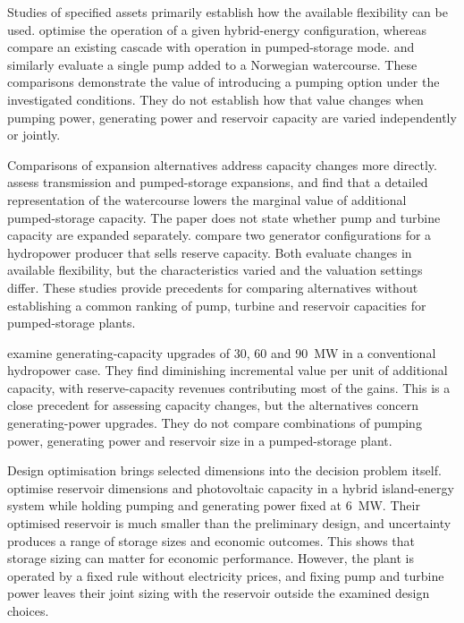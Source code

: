 Studies of specified assets primarily establish how the available
flexibility can be used. \citet{naval2025optimization} optimise the
operation of a given hybrid-energy configuration, whereas
\citet{ak2019quantifying} compare an existing cascade with operation in
pumped-storage mode. \citet{alic2023optimal} and
\citet{schuller2024practical} similarly evaluate a single pump added to
a Norwegian watercourse. These comparisons demonstrate the value of
introducing a pumping option under the investigated conditions. They do
not establish how that value changes when pumping power, generating
power and reservoir capacity are varied independently or jointly.

Comparisons of expansion alternatives address capacity changes more
directly. \citet{helseth2017} assess transmission and pumped-storage
expansions, and find that a detailed representation of the watercourse
lowers the marginal value of additional pumped-storage capacity. The
paper does not state whether pump and turbine capacity are expanded
separately. \citet{helseth2017iet} compare two generator configurations
for a hydropower producer that sells reserve capacity. Both evaluate
changes in available flexibility, but the characteristics varied and the
valuation settings differ. These studies provide precedents for
comparing alternatives without establishing a common ranking of pump,
turbine and reservoir capacities for pumped-storage plants.

\citet{bore2026assessing} examine generating-capacity upgrades of 30, 60
and \SI{90}{\mega\watt} in a conventional hydropower case. They find
diminishing incremental value per unit of additional capacity, with
reserve-capacity revenues contributing most of the gains. This is a
close precedent for assessing capacity changes, but the alternatives
concern generating-power upgrades. They do not compare combinations of
pumping power, generating power and reservoir size in a pumped-storage
plant.

Design optimisation brings selected dimensions into the decision problem
itself. \citet{zisos2023mixing} optimise reservoir dimensions and
photovoltaic capacity in a hybrid island-energy system while holding
pumping and generating power fixed at \SI{6}{\mega\watt}. Their
optimised reservoir is much smaller than the preliminary design, and
uncertainty produces a range of storage sizes and economic outcomes.
This shows that storage sizing can matter for economic performance.
However, the plant is operated by a fixed rule without electricity
prices, and fixing pump and turbine power leaves their joint sizing with
the reservoir outside the examined design choices.

